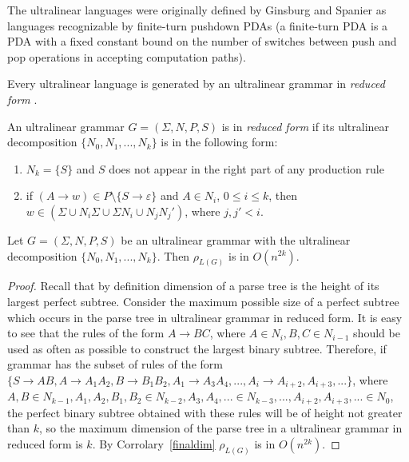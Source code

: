 The ultralinear languages were originally defined by Ginsburg and Spanier \cite{Ginsburg1966FiniteTurnPA} as languages recognizable by finite-turn pushdown PDAs (a finite-turn PDA is a PDA with a fixed constant bound on the number of switches between push and pop operations in accepting computation paths). 

Every ultralinear language is generated by an ultralinear grammar in \textit{reduced form} \cite{WORKMAN1976188}.
\begin{definition}
An ultralinear grammar $G = (\Sigma, N, P, S)$ is in \textit{reduced form} if its ultralinear decomposition $\{N_0, N_1, ..., N_k\}$ is in the following form:
\begin{enumerate}
\item $N_k=\{S\}$ and $S$ does not appear in the right part of any production rule
\item if $(A \rightarrow w) \in P \setminus \{S \rightarrow \varepsilon\}$ and $A \in N_i$, $0 \le i \le k$, then $w \in (\Sigma \cup N_i\Sigma \cup \Sigma N_i \cup N_jN_j')$, where $j, j' < i$.
\end{enumerate}
\end{definition}
\begin {theorem}
Let $G = (\Sigma, N, P, S)$ be an ultralinear grammar with the ultralinear decomposition $\{N_0, N_1, ..., N_k\}$. Then $\rho_{L(G)}$ is in $O(n^{2k})$.
\end{theorem}
\begin{proof}
Recall that by definition dimension of a parse tree is the height of its largest perfect subtree. Consider the maximum possible size of a perfect subtree which occurs in the parse tree in ultralinear grammar in reduced form. It is easy to see that the rules of the form $A \rightarrow BC$, where $A \in N_i, B, C \in N_{i-1}$ should be used as often as possible to construct the largest binary subtree. Therefore, if grammar has the subset of rules of the form $\{S \rightarrow AB, A \rightarrow A_1A_2, B \rightarrow B_1B_2, A_1\rightarrow A_3A_4, ..., A_i \rightarrow A_{i+2}, A_{i+3}, ...\}$, where $A, B \in N_{k-1}, A_1, A_2, B_1, B_2 \in N_{k-2}, A_3, A_4, ... \in N_{k-3}, ... , A_{i+2}, A_{i+3}, ... \in N_0$, the perfect binary subtree obtained with these rules will be of height not greater than $k$, so the maximum dimension of the parse tree in a ultralinear grammar in reduced form is $k$. By Corrolary~\ref{finaldim}  $\rho_{L(G)}$ is in $O(n^{2k})$.
\end{proof}